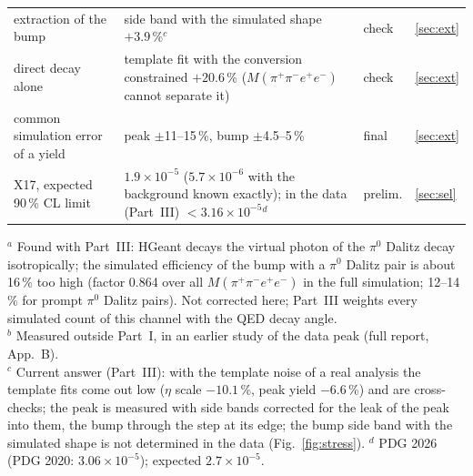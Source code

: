 \documentclass[11pt,a4paper]{article}
\newcommand{\piz}{\ensuremath{\pi^{0}}\xspace}
\newcommand{\Mfour}{\ensuremath{M(\pi^{+}\pi^{-}e^{+}e^{-})}\xspace}
\begin{document}
\begin{table}[H]
\begin{tabularx}{\textwidth}{@{}>{\raggedright\arraybackslash}p{4.5cm} L >{\raggedright\arraybackslash}p{1.35cm} >{\raggedright\arraybackslash}p{0.8cm}@{}}
extraction of the bump & side band with the simulated shape $+3.9$\,\%$^{c}$ & check & \ref{sec:ext} \\
direct decay alone & template fit with the conversion constrained $+20.6$\,\% (\Mfour cannot separate it) & check & \ref{sec:ext} \\
common simulation error of a yield & peak $\pm$11--15\,\%, bump $\pm$4.5--5\,\% & final & \ref{sec:ext} \\
X17, expected 90\,\% CL limit & $1.9\times10^{-5}$ ($5.7\times10^{-6}$ with the background known exactly); in the data (Part~III) $<3.16\times10^{-5}$$^{d}$ & prelim. & \ref{sec:sel} \\
\bottomrule
\end{tabularx}

{\raggedright\footnotesize $^{a}$ Found with Part~III: HGeant decays the virtual photon of the \piz Dalitz decay
isotropically; the simulated efficiency of the bump with a \piz Dalitz pair is about 16\,\% too high (factor 0.864 over all
\Mfour in the full simulation; 12--14\,\% for prompt \piz Dalitz pairs). Not corrected here; Part~III weights every simulated
count of this channel with the QED decay angle.\\
$^{b}$ Measured outside Part~I, in an earlier study of the data peak (full report, App.~B).\\
$^{c}$ Current answer (Part~III): with the template noise of a real analysis the template fits come out low ($\eta$ scale
$-10.1$\,\%, peak yield $-6.6$\,\%) and are cross-checks; the peak is measured with side bands corrected for the leak of the
peak into them, the bump through the step at its edge; the bump side band with the simulated shape is not determined in the
data (Fig.~\ref{fig:stress}). $^{d}$ PDG 2026 (PDG 2020: $3.06\times10^{-5}$); expected $2.7\times10^{-5}$.\par}
\end{table}
\end{document}
